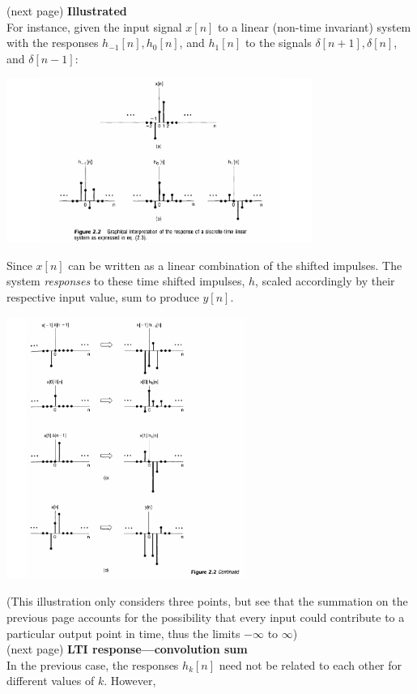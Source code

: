 \documentclass{report}
\begin{document}
(next page)\newpage
\noindent\textbf{Illustrated}\\
For instance, given the input signal $x[n]$ to a linear (non-time invariant) system with the responses $h_{-1}[n],h_{0}[n]$, and 
$h_{1}[n]$ to the signals $\delta[n+1],\delta[n]$, and $\delta[n-1]$:
\begin{center}
\includegraphics[width=10cm]{a18}
\end{center}
Since $x[n]$ can be written as a linear combination of the shifted impulses.
The system \textit{responses} to these time shifted impulses, $h$, scaled accordingly by their respective input value, sum to produce 
$y[n]$.
\begin{center}
\includegraphics[width=7.8cm]{a19}
\end{center}
(This illustration only considers three points, but see that the summation on the previous page accounts for the possibility
that every input could contribute to a particular output point in time, thus the limits $-\infty$ to $\infty$)\\
(next page)\newpage
\noindent\textbf{LTI response---convolution sum}\\
In the previous case, the responses $h_k[n]$ need not be related to each other for different values of $k$. However,
\end{document}
